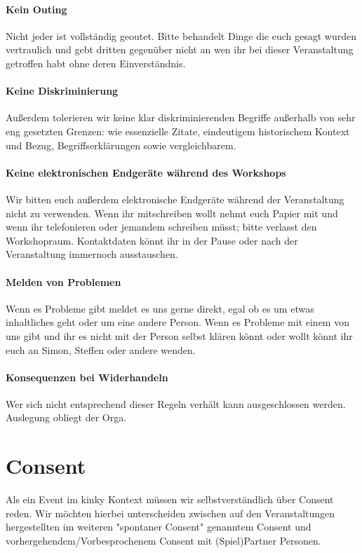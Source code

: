 \documentclass{article}
\begin{document}
\paragraph{\textcolor{PastelRed}{Kein Outing}}
Nicht jeder ist vollständig geoutet. Bitte behandelt Dinge die euch gesagt wurden vertraulich und gebt dritten gegenüber nicht an wen ihr bei dieser Veranstaltung getroffen habt ohne deren Einverständnis.
\paragraph{\textcolor{PastelRed}{Keine Diskriminierung}}
Außerdem tolerieren wir keine klar diskriminierenden Begriffe außerhalb von sehr eng gesetzten Grenzen: wie essenzielle Zitate, eindeutigem historischem Kontext und Bezug, Begriffserklärungen sowie vergleichbarem.
\paragraph{\textcolor{PastelRed}{Keine elektronischen Endgeräte während des Workshops}}
Wir bitten euch außerdem elektronische Endgeräte während der Veranstaltung nicht zu verwenden. Wenn ihr mitschreiben wollt nehmt euch Papier mit und wenn ihr telefonieren oder jemandem schreiben müsst; bitte verlasst den Workshopraum. Kontaktdaten könnt ihr in der Pause oder nach der Veranstaltung immernoch ausstauschen.
\paragraph{\textcolor{PastelRed}{Melden von Problemen}}
Wenn es Probleme gibt meldet es uns gerne direkt, egal ob es um etwas inhaltliches geht oder um eine andere Person. Wenn es Probleme mit einem von uns gibt und ihr es nicht mit der Person selbst klären könnt oder wollt könnt ihr euch an Simon, Steffen oder andere wenden.
\paragraph{\textcolor{PastelRed}{Konsequenzen bei Widerhandeln}}
Wer sich nicht entsprechend dieser Regeln verhält kann ausgeschlossen werden. Auslegung obliegt der Orga.

\section{Consent}
Als ein Event im kinky Kontext müssen wir selbstverständlich über Consent reden. Wir möchten hierbei unterscheiden zwischen auf den Veranstaltungen hergestellten im weiteren "spontaner Consent" genanntem Consent und vorhergehendem/Vorbesprochenem Consent mit (Spiel)Partner Personen.
\end{document}
